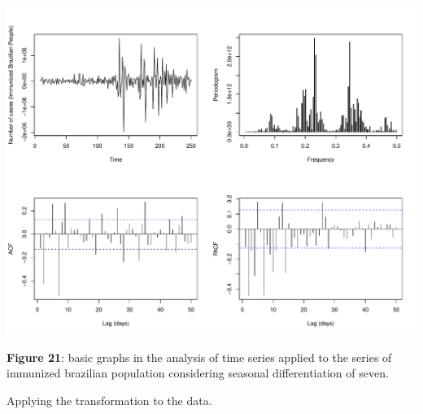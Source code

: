\documentclass[
]{article}
\begin{document}
\begin{center}\includegraphics[width=\linewidth]{IF_results_ENG_files/figure-latex/unnamed-chunk-26-1} \end{center}

\textbf{Figure 21}: basic graphs in the analysis of time series applied
to the series of immunized brazilian population considering seasonal
differentiation of seven.

Applying the transformation to the data.
\end{document}
